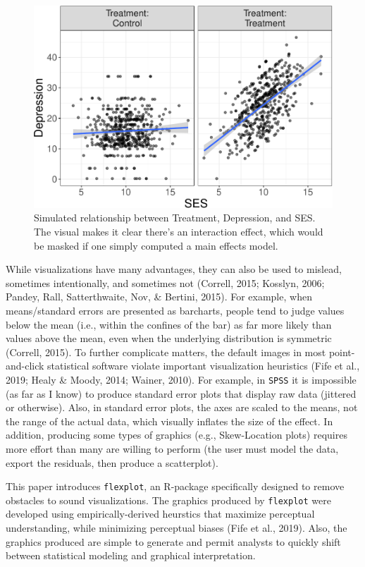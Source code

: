 \documentclass[
  doc]{apa6}
\begin{document}
\begin{figure}
\centering
\includegraphics{flexplot_psychmeth_files/figure-latex/ses-1.pdf}
\caption{\label{fig:ses}Simulated relationship between Treatment, Depression, and SES. The visual makes it clear there's an interaction effect, which would be masked if one simply computed a main effects model.}
\end{figure}

While visualizations have many advantages, they can also be used to mislead, sometimes intentionally, and sometimes not (Correll, 2015; Kosslyn, 2006; Pandey, Rall, Satterthwaite, Nov, \& Bertini, 2015). For example, when means/standard errors are presented as barcharts, people tend to judge values below the mean (i.e., within the confines of the bar) as far more likely than values above the mean, even when the underlying distribution is symmetric (Correll, 2015). To further complicate matters, the default images in most point-and-click statistical software violate important visualization heuristics (Fife et al., 2019; Healy \& Moody, 2014; Wainer, 2010). For example, in \texttt{SPSS} it is impossible (as far as I know) to produce standard error plots that display raw data (jittered or otherwise). Also, in standard error plots, the axes are scaled to the means, not the range of the actual data, which visually inflates the size of the effect. In addition, producing some types of graphics (e.g., Skew-Location plots) requires more effort than many are willing to perform (the user must model the data, export the residuals, then produce a scatterplot).

This paper introduces \texttt{flexplot}, an R-package specifically designed to remove obstacles to sound visualizations. The graphics produced by \texttt{flexplot} were developed using empirically-derived heurstics that maximize perceptual understanding, while minimizing perceptual biases (Fife et al., 2019). Also, the graphics produced are simple to generate and permit analysts to quickly shift between statistical modeling and graphical interpretation.
\end{document}
